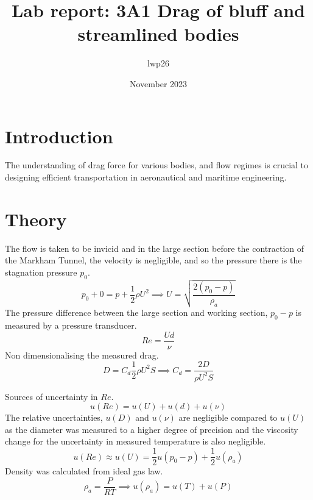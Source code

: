 \documentclass[8pt]{article}
\begin{document}


\title{Lab report: 3A1 Drag of bluff and streamlined bodies}
\author{lwp26}
\date{November 2023}
\maketitle

\section{Introduction}

The understanding of drag force for various bodies, and flow regimes is crucial to designing efficient transportation in aeronautical and maritime engineering.

\section{Theory}

The flow is taken to be invicid and in the large section before the contraction of the Markham Tunnel, the velocity is negligible, and so the pressure there is the stagnation pressure $p_0$.
\begin{equation}
    p_0 + 0 = p + \frac{1}{2}\rho U^2 \implies U = \sqrt{\frac{2(p_0-p)}{\rho_a}}
    \label{eq1}
\end{equation}
The pressure difference between the large section and working section, $p_0 - p$ is measured by a pressure transducer.
\begin{equation}
    Re = \frac{Ud}{\nu}
\end{equation}
Non dimensionalising the measured drag.
\begin{equation}
    D = C_d \frac{1}{2} \rho U^2 S \implies C_d = \frac{2D}{ \rho U^2 S}
\end{equation}

Sources of uncertainty in $Re$.
\begin{equation}
    u(Re) = u(U) + u(d) + u(\nu)
\end{equation}
The relative uncertainties, $u(D)$ and $u(\nu)$ are negligible compared to $u(U)$ as the diameter was measured to a higher degree of precision and the viscosity change for the uncertainty in measured temperature is also negligible.
\begin{equation}
    u(Re) \approx u(U) = \frac{1}{2}u(p_0-p) + \frac{1}{2}u(\rho_a)
    \label{eq5}
\end{equation}
Density was calculated from ideal gas law.
\begin{equation}
    \rho_a = \frac{P}{RT} \implies u(\rho_a) = u(T) + u(P)
\end{equation}
\end{document}
